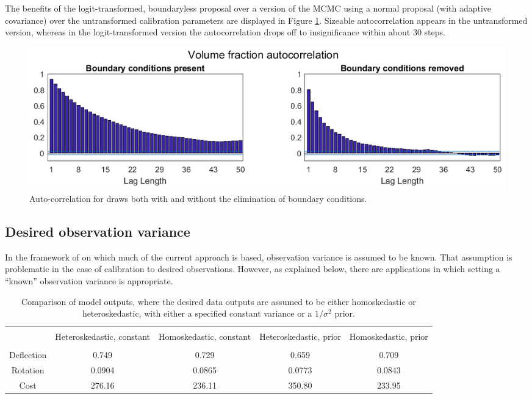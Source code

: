 \documentclass{article}
\begin{document}
The benefits of the logit-transformed, boundaryless proposal over a version of the MCMC using a normal proposal (with adaptive covariance) over the untransformed calibration parameters are displayed in Figure \ref{ACFs}. Sizeable autocorrelation appears in the untransformed version, whereas in the logit-transformed version the autocorrelation drops off to insignificance within about 30 steps.

\begin{figure}
\centering
\includegraphics[width=.9\linewidth]{ACF_bnd_cnds_fig}
\caption{Auto-correlation for draws both with and without the elimination of boundary conditions.}
\label{ACFs}
\end{figure}

\subsection{Desired observation variance}\label{des_obs_var}

In the framework of \cite{Kennedy2006} on which much of the current approach is based, observation variance is assumed to be known. That assumption is problematic in the case of calibration to desired observations. However, as explained below, there are applications in which setting a ``known'' observation variance is appropriate.
\begin{table}[h]
\centering
\begin{tabular}{| c | c  |  c  | c |  c  |}
\hline
 \vspace{-3mm}
& & & & \\
& \parbox{24mm}{\centering Heteroskedastic, constant}& \parbox{24mm}{\centering Homoskedastic, constant}& \parbox{24mm}{\centering Heteroskedastic, prior} & \parbox{24mm}{\centering Homoskedastic, prior}\\
 \vspace{-3.5mm}
& & & & \\
\hline
Deflection & 0.749 & 0.729 & 0.659 & 0.709\\
Rotation & 0.0904 & 0.0865 & 0.0773 & 0.0843\\
Cost & 276.16 & 236.11 & 350.80 & 233.95 \\
\hline
\end{tabular}
\caption{Comparison of model outputs, where the desired data outputs are assumed to be either homoskedastic or heteroskedastic, with either a specified constant variance or a $1/\sigma^2$ prior.}
\label{table:obs_var_comp}
\end{table}
\end{document}
